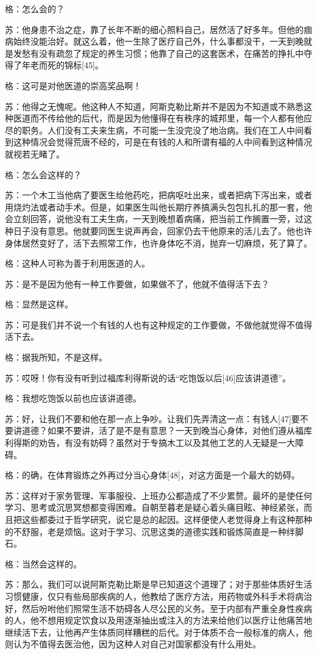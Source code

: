 \documentclass[12pt,oneside]{book}
\begin{document}
格：怎么会的？

苏：他身患不治之症，靠了长年不断的细心照料自己，居然活了好多年。但他的痼病始终没能治好。就这么着，他一生除了医疗自己外，什么事都没干，一天到晚就是发愁有没有疏忽了规定的养生习惯；他靠了自己的这套医术，在痛苦的挣扎中夺得了年老而死的锦标[45]。

格：这可是对他医道的崇高奖品啊！

苏：他得之无愧呢。他这种人不知道，阿斯克勒比斯并不是因为不知道或不熟悉这种医道而不传给他的后代，而是因为他懂得在有秩序的城邦里，每一个人都有他应尽的职务。人们没有工夫来生病，不可能一生没完没了地治病。我们在工人中间看到这种情况会觉得荒唐不经的，可是在有钱的人和所谓有福的人中间看到这种情况就视若无睹了。

格：怎么会这样的？

苏：一个木工当他病了要医生给他药吃，把病呕吐出来，或者把病下泻出来，或者用烧灼法或者动手术。但是，如果医生叫他长期疗养搞满头包包扎扎的那一套，他会立刻回答，说他没有工夫生病，一天到晚想着病痛，把当前工作搁置一旁，过这种日子没有意思。他就要同医生说声再会，回家仍去干他原来的活儿去了。他也许身体居然变好了，活下去照常工作，也许身体吃不消，抛弃一切麻烦，死了算了。

格：这种人可称为善于利用医道的人。

苏：是不是因为他有一种工作要做，如果做不了，他就不值得活下去？

格：显然是这样。

苏：可是我们并不说一个有钱的人也有这种规定的工作要做，不做他就觉得不值得活下去。

格：据我所知，不是这样。

苏：哎呀！你有没有听到过福库利得斯说的话“吃饱饭以后[46]应该讲道德”。

格：我想吃饱饭以前也应该讲道德。

苏：好，让我们不要和他在那一点上争吵。让我们先弄清这一点：有钱人[47]要不要讲道德？如果不要讲，活了是不是有意思？一天到晚当心身体，对他们遵从福库利得斯的劝告，有没有妨碍？虽然对于专搞木工以及其他工艺的人无疑是一大障碍。

格：的确，在体育锻炼之外再过分当心身体[48]，对这方面是一个最大的妨碍。

苏：这样对于家务管理、军事服役、上班办公都造成了不少累赘。最坏的是使任何学习、思考或沉思冥想都变得困难。自朝至暮老是疑心着头痛目眩、神经紧张，而且把这些都委过于哲学研究，说它是总的起因。这样便使人老觉得身上有这种那种的不舒服，老是烦恼。这对于学习、沉思这类的道德实践和锻炼简直是一种绊脚石。

格：当然会这样的。

苏：那么，我们可以说阿斯克勒比斯是早已知道这个道理了；对于那些体质好生活习惯健康，仅只有些局部疾病的人，他教给了医疗方法，用药物或外科手术将病治好，然后吩咐他们照常生活不妨碍各人尽公民的义务。至于内部有严重全身性疾病的人，他不想用规定饮食以及用逐渐抽出或注入的方法来给他们以医疗让他痛苦地继续活下去，让他再产生体质同样糟糕的后代。对于体质不合一般标准的病人，他则认为不值得去医治他，因为这种人对自己对国家都没有什么用处。
\end{document}
